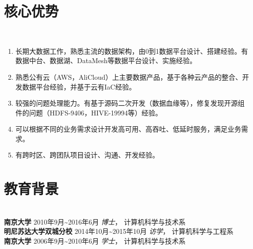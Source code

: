 \documentclass{res}[8.5pt]
\begin{document}
\begin{resume}
\section{核心优势}

\hrulefill\\
\begin{enumerate}
\item 长期大数据工作，熟悉主流的数据架构，由0到1数据平台设计、搭建经验。有数据中台、数据湖、DataMesh等数据平台设计、实施经验。
\item 熟悉公有云（AWS，AliCloud）上主要数据产品，基于各种云产品的整合、开发数据平台经验，并基于云有IaC经验。
\item 较强的问题处理能力。有基于源码二次开发（数据血缘等），修复发现开源组件的问题（HDFS-9406，HIVE-19994等）经验。
\item 可以根据不同的业务需求设计开发高可用、高吞吐、低延时服务，满足业务需求。
\item 有跨时区、跨团队项目设计、沟通、开发经验。
\end{enumerate}

\section{{教育背景}}

\hrulefill\\
{\bf 南京大学} \hfill  2010年9月\textasciitilde 2016年6月 \hspace{0.25in}
{\sl 博士}， 计算机科学与技术系\\
{\bf 明尼苏达大学双城分校} \hfill 2014年10月\textasciitilde 2015年10月 \hspace{0.25in}
{\sl 访学}， 计算机科学与工程系  \\
{\bf 南京大学}  \hfill 2006年9月\textasciitilde 2010年6月  \hspace{0.25in}
{\sl 学士}， 计算机科学与技术系

\end{resume}
\end{document}
